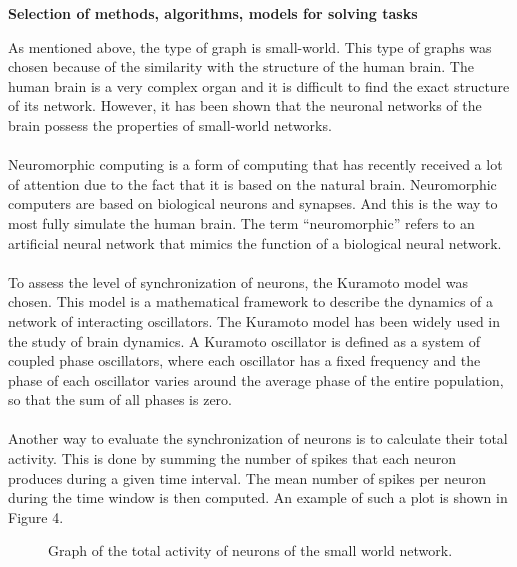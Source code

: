\documentclass[draft]{article}
\newcommand\tab[1][1cm]{\hspace*{#1}}
\begin{document}
\begin{center}
\textbf{Selection of methods, algorithms, models for solving tasks}\\
\end{center}
\tab As mentioned above, the type of graph is small-world. This type of graphs was chosen because of the similarity with the structure of the human brain. The human brain is a very complex organ and it is difficult to find the exact structure of its network. However, it has been shown that the neuronal networks of the brain possess the properties of small-world networks.\\
~\\
\tab Neuromorphic computing is a form of computing that has recently received a lot of attention due to the fact that it is based on the natural brain. Neuromorphic computers are based on biological neurons and synapses. And this is the way to most fully simulate the human brain. The term “neuromorphic” refers to an artificial neural network that mimics the function of a biological neural network.\\
~\\
\tab To assess the level of synchronization of neurons, the Kuramoto model was chosen. This model is a mathematical framework to describe the dynamics of a network of interacting oscillators. The Kuramoto model has been widely used in the study of brain dynamics. A Kuramoto oscillator is defined as a system of coupled phase oscillators, where each oscillator has a fixed frequency and the phase of each oscillator varies around the average phase of the entire population, so that the sum of all phases is zero.\\
~\\
\tab Another way to evaluate the synchronization of neurons is to calculate their total activity. This is done by summing the number of spikes that each neuron produces during a given time interval. The mean number of spikes per neuron during the time window is then computed. An example of such a plot is shown in Figure 4.\\
\begin{figure}[h]
\caption{Graph of the total activity of neurons of the small world network.}
\label{ris:image}
\end{figure}\\
\end{document}
